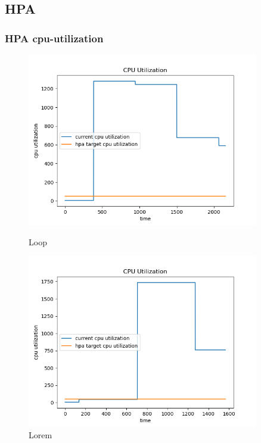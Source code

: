 \subsection{HPA}
\subsubsection{HPA cpu-utilization}
\begin{figure}[h]
    \begin{minipage}[t]{0.5\textwidth}
        \centering
        \includegraphics[width=0.9\textwidth]{../sample_results/loop/hpa/cpu-utilization-hpa.png}
        \caption{Loop}
    \end{minipage}
    \hfill
    \begin{minipage}[t]{0.5\textwidth}
        \centering
        \includegraphics[width=0.9\textwidth]{../sample_results/lorem/hpa/cpu-utilization-hpa.png}
        \caption{Lorem}
    \end{minipage}
\end{figure}
